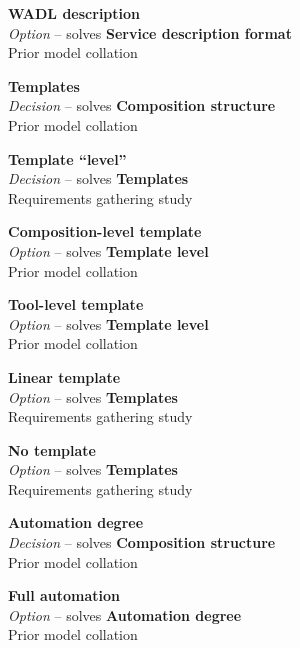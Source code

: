 \textbf{WADL description} \\ \emph{Option} -- solves \textbf{Service description format} \\ Prior model collation \cite{Pietschmann2010}

\textbf{Templates} \\ \emph{Decision} -- solves \textbf{Composition structure} \\ Prior model collation \cite{Pietschmann2010}

\textbf{Template ``level''} \\ \emph{Decision} -- solves \textbf{Templates} \\ Requirements gathering study

\textbf{Composition-level template} \\ \emph{Option} -- solves \textbf{Template level} \\ Prior model collation \cite{Pietschmann2010}

\textbf{Tool-level template} \\ \emph{Option} -- solves \textbf{Template level} \\ Prior model collation \cite{Pietschmann2010}

\textbf{Linear template} \\ \emph{Option} -- solves \textbf{Templates} \\ Requirements gathering study

\textbf{No template} \\ \emph{Option} -- solves \textbf{Templates} \\ Requirements gathering study

\textbf{Automation degree} \\ \emph{Decision} -- solves \textbf{Composition structure} \\ Prior model collation \cite{Aghaee2012}


\textbf{Full automation} \\ \emph{Option} -- solves \textbf{Automation degree} \\ Prior model collation \cite{Aghaee2012,Fischer2009}

